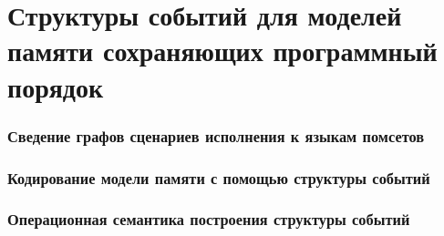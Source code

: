 \chapter{Структуры событий для моделей памяти сохраняющих программный порядок}
\label{ch:porf-evenstruct}

\subsection{Сведение графов сценариев исполнения к языкам помсетов}

\subsection{Кодирование модели памяти с помощью структуры событий}

\subsection{Операционная семантика построения структуры событий}
